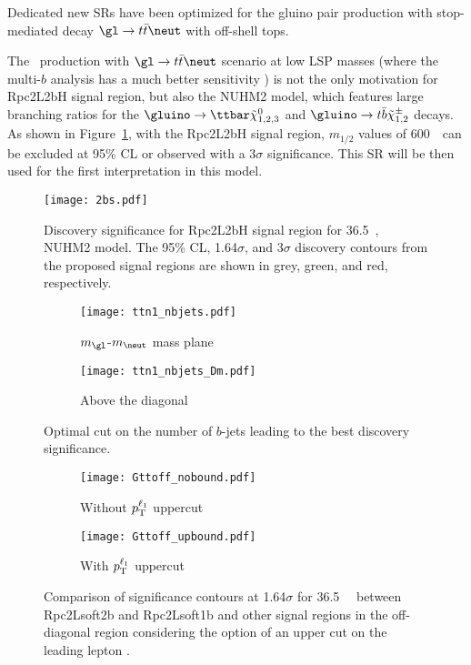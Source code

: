 Dedicated new SRs have been optimized for the gluino pair production with stop-mediated decay $\gl\to t\bar t\neut$ with off-shell tops.

The \glgl\ production with $\gl\to t\bar t\neut$ scenario at low LSP masses (where the multi-$b$ analysis has a much better sensitivity
\cite{ATLAS-CONF-2017-021}) is not the only motivation for Rpc2L2bH signal region, but also the NUHM2 model, which features large branching ratios for the $\gluino\to\ttbar\tilde{\chi}_{1,2,3}^0$ and $\gluino\to t\bar{b}\tilde{\chi}_{1,2}^\pm$ decays. As shown in Figure~\ref{fig:SR_nuhm}, with the Rpc2L2bH signal region,  $m_{1/2}$ values of 600~\GeV~can be excluded at 95\% CL or observed with a 3$\sigma$ significance.
This SR will be then used for the first interpretation in this model.

\begin{figure}[t]
\centering
\texttt{[image: 2bs.pdf]}
\caption{Discovery significance for Rpc2L2bH signal region for 36.5~\ifb, NUHM2 model. The 95\% CL, 1.64$\sigma$, and 3$\sigma$ discovery contours from the proposed signal regions are shown in grey, green, and red, respectively.
}
\label{fig:SR_nuhm}
\end{figure}


\begin{figure}
\centering
\begin{subfigure}[t]{0.48\textwidth}
\caption{$m_{\gl}$-$m_{\neut}$ mass plane}
\texttt{[image: ttn1\_nbjets.pdf]}
\end{subfigure}
\begin{subfigure}[t]{0.48\textwidth}
\caption{Above the diagonal}
\texttt{[image: ttn1\_nbjets\_Dm.pdf]}
\end{subfigure}
\caption{Optimal cut on the number of $b$-jets leading to the best discovery significance.
}
\label{fig:SR_Gtt_bjets}
\end{figure}

\begin{figure}
\centering
\begin{subfigure}[t]{0.48\textwidth}
\caption{Without $p_{\rm T}^{\ell_1}$ uppercut}
\texttt{[image: Gttoff\_nobound.pdf]}
\end{subfigure}
\begin{subfigure}[t]{0.48\textwidth}
\caption{With $p_{\rm T}^{\ell_1}$ uppercut}
\texttt{[image: Gttoff\_upbound.pdf]}
\end{subfigure}
\caption{Comparison of significance contours at 1.64$\sigma$ for 36.5~\ifb~ between Rpc2Lsoft2b and Rpc2Lsoft1b and other signal regions in the off-diagonal region considering the option of an upper cut on the leading lepton \pt.}
\label{fig:SR_ptbound}
\end{figure}

